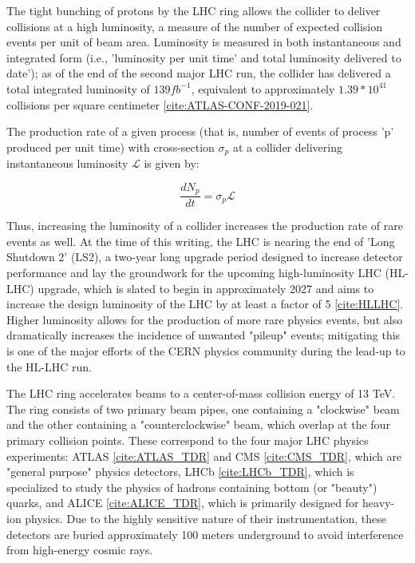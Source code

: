 The tight bunching of protons by the LHC ring allows the collider to deliver collisions at a high luminosity, a measure of the number of expected collision events per unit of beam area. Luminosity is measured in both instantaneous and integrated form (i.e., 'luminosity per unit time' and total luminosity delivered to date'); as of the end of the second major LHC run, the collider has delivered a total integrated luminosity of $139 fb^{-1}$, equivalent to approximately $1.39*10^{41}$ collisions per square centimeter \ref{cite:ATLAS-CONF-2019-021}. 

The production rate of a given process (that is, number of events of process 'p' produced per unit time) with cross-section $\sigma_{p}$ at a collider delivering instantaneous luminosity $\mathcal{L}$ is given by:

\begin{equation}
\frac{dN_{p}}{dt} = \sigma_{p} \mathcal{L}
\end{equation}

Thus, increasing the luminosity of a collider increases the production rate of rare events as well. At the time of this writing, the LHC is nearing the end of 'Long Shutdown 2' (LS2), a two-year long upgrade period designed to increase detector performance and lay the groundwork for the upcoming high-luminosity LHC (HL-LHC) upgrade, which is slated to begin in approximately 2027 and aims to increase the design luminosity of the LHC by at least a factor of 5 \ref{cite:HLLHC}. Higher luminosity allows for the production of more rare physics events, but also dramatically increases the incidence of unwanted "pileup" events; mitigating this is one of the major efforts of the CERN physics community during the lead-up to the HL-LHC run.

The LHC ring accelerates beams to a center-of-mass collision energy of 13 TeV. The ring consists of two primary beam pipes, one containing a "clockwise" beam and the other containing a "counterclockwise" beam, which overlap at the four primary collision points. These correspond to the four major LHC physics experiments: ATLAS \ref{cite:ATLAS_TDR} and CMS \ref{cite:CMS_TDR}, which are "general purpose" physics detectors, LHCb \ref{cite:LHCb_TDR}, which is specialized to study the physics of hadrons containing bottom (or "beauty") quarks, and ALICE \ref{cite:ALICE_TDR}, which is primarily designed for heavy-ion physics. Due to the highly sensitive nature of their instrumentation, these detectors are buried approximately 100 meters underground to avoid interference from high-energy cosmic rays.

